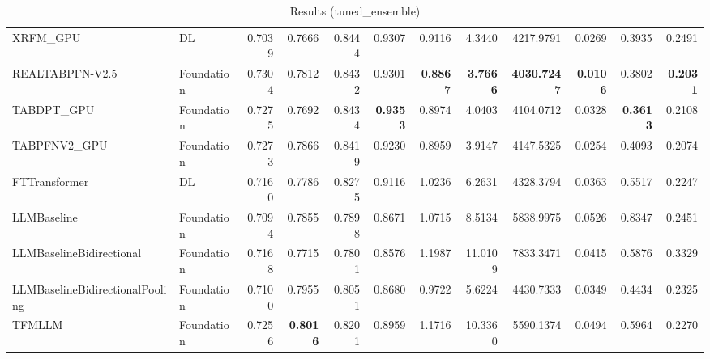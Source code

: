 \begin{table}[htbp]
{\begin{tabular}{ll|rrrrrrrrrr}
XRFM\_GPU & DL & 0.7039 & 0.7666 & 0.8444 & 0.9307 & 0.9116 & 4.3440 & 4217.9791 & 0.0269 & 0.3935 & 0.2491 \\
REALTABPFN-V2.5 & Foundation & 0.7304 & 0.7812 & 0.8432 & 0.9301 & \textbf{0.8867} & \textbf{3.7666} & \textbf{4030.7247} & \textbf{0.0106} & 0.3802 & \textbf{0.2031} \\
TABDPT\_GPU & Foundation & 0.7275 & 0.7692 & 0.8434 & \textbf{0.9353} & 0.8974 & 4.0403 & 4104.0712 & 0.0328 & \textbf{0.3613} & 0.2108 \\
TABPFNV2\_GPU & Foundation & 0.7273 & 0.7866 & 0.8419 & 0.9230 & 0.8959 & 3.9147 & 4147.5325 & 0.0254 & 0.4093 & 0.2074 \\
\midrule
FTTransformer & DL & 0.7160 & 0.7786 & 0.8275 & 0.9116 & 1.0236 & 6.2631 & 4328.3794 & 0.0363 & 0.5517 & 0.2247 \\
LLMBaseline & Foundation & 0.7094 & 0.7855 & 0.7898 & 0.8671 & 1.0715 & 8.5134 & 5838.9975 & 0.0526 & 0.8347 & 0.2451 \\
LLMBaselineBidirectional & Foundation & 0.7168 & 0.7715 & 0.7801 & 0.8576 & 1.1987 & 11.0109 & 7833.3471 & 0.0415 & 0.5876 & 0.3329 \\
LLMBaselineBidirectionalPooling & Foundation & 0.7100 & 0.7955 & 0.8051 & 0.8680 & 0.9722 & 5.6224 & 4430.7333 & 0.0349 & 0.4434 & 0.2325 \\
TFMLLM & Foundation & 0.7256 & \textbf{0.8016} & 0.8201 & 0.8959 & 1.1716 & 10.3360 & 5590.1374 & 0.0494 & 0.5964 & 0.2270 \\
\bottomrule
\end{tabular}
}
\caption{Results (tuned_ensemble)}
\label{tab:results_tuned_ensemble}
\end{table}